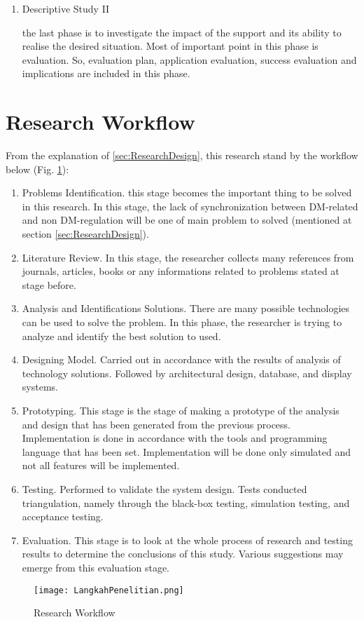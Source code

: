 \begin{enumerate}
\item[4.]Descriptive Study II\par
the last phase is to investigate the impact of the support and its ability to realise the desired situation. Most of important point in this phase is evaluation. So, evaluation plan, application evaluation, success evaluation and implications are included in this phase. 
\end{enumerate}\par

\section{Research Workflow}
From the explanation of \ref{sec:ResearchDesign}, this research stand by the workflow below (Fig. \ref{fig:LangkahPenelitian}): \begin{enumerate}
\item[1.] Problems Identification. this stage becomes the important thing to be solved in this research. In this stage, the lack of synchronization between DM-related and non DM-regulation will be one of main problem to solved (mentioned at section \ref{sec:ResearchDesign}).
\item[2.] Literature Review. In this stage, the researcher collects many references from journals, articles, books or any informations related to problems stated at stage before.
\item[3.] Analysis and Identifications Solutions. There are many possible technologies can be used to solve the problem. In this phase, the researcher is trying to analyze and identify the best solution to used. 
\item[4.] Designing Model. Carried out in accordance with the results of analysis of technology solutions. Followed by architectural design, database, and display systems.
\item[5.] Prototyping. This stage is the stage of making a prototype of the analysis and design that has been generated from the previous process. Implementation is done in accordance with the tools and programming language that has been set. Implementation will be done only simulated and not all features will be implemented.
\item[6.] Testing. Performed to validate the system design. Tests conducted triangulation, namely through the black-box testing, simulation testing, and acceptance testing.
\item[7.] Evaluation. This stage is to look at the whole process of research and testing results to determine the conclusions of this study. Various suggestions may emerge from this evaluation stage.
\end{enumerate}\par
\begin{figure}[H]
\centering
\texttt{[image: LangkahPenelitian.png]}
\label{fig:LangkahPenelitian}
\caption{Research Workflow}
\end{figure}\par
